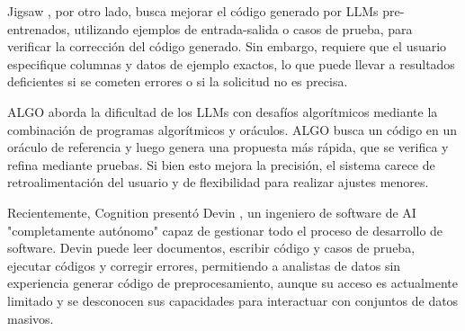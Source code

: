 Jigsaw \cite{jain2022jigsaw}, por otro lado, busca mejorar el código generado por LLMs pre-entrenados, utilizando ejemplos de entrada-salida o casos de prueba, para verificar la corrección del código generado. Sin embargo, requiere que el usuario especifique columnas y datos de ejemplo exactos, lo que puede llevar a resultados deficientes si se cometen errores o si la solicitud no es precisa.

ALGO \cite{zhang2023algo} aborda la dificultad de los LLMs con desafíos algorítmicos mediante la combinación de programas algorítmicos y oráculos. ALGO busca un código en un oráculo de referencia y luego genera una propuesta más rápida, que se verifica y refina mediante pruebas. Si bien esto mejora la precisión, el sistema carece de retroalimentación del usuario y de flexibilidad para realizar ajustes menores.

Recientemente, Cognition presentó Devin \cite{devin}, un ingeniero de software de AI "completamente autónomo" capaz de gestionar todo el proceso de desarrollo de software. Devin puede leer documentos, escribir código y casos de prueba, ejecutar códigos y corregir errores, permitiendo a analistas de datos sin experiencia generar código de preprocesamiento, aunque su acceso es actualmente limitado y se desconocen sus capacidades para interactuar con conjuntos de datos masivos.